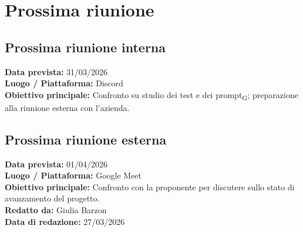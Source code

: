 \documentclass[a4paper,12pt]{article}
\newcommand{\gls}[1]{#1\textsubscript{G}}
\begin{document}
\section*{Prossima riunione}
\subsection*{Prossima riunione interna}
\textbf{Data prevista:} 31/03/2026 \\
\textbf{Luogo / Piattaforma:} Discord \\
\textbf{Obiettivo principale:} Confronto su studio dei test e dei \gls{prompt}; preparazione alla riunione esterna con l'azienda. \\

\subsection*{Prossima riunione esterna}
\textbf{Data prevista:} 01/04/2026 \\
\textbf{Luogo / Piattaforma:} Google Meet \\
\textbf{Obiettivo principale:} Confronto con la proponente per discutere sullo stato di avanzamento del progetto. \\



\textbf{Redatto da:} Giulia Barzon \\
\textbf{Data di redazione:} 27/03/2026
\end{document}
